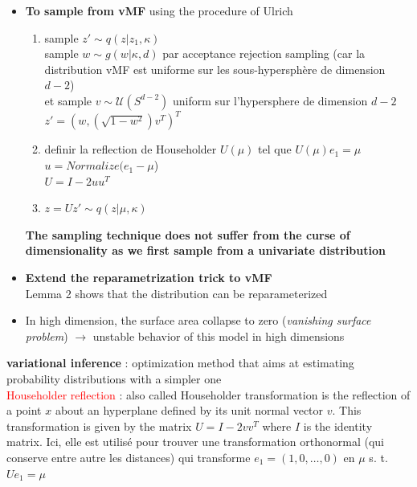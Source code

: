 \documentclass[12pt]{article}
\newcommand{\red}[1]{\textcolor{red}{#1}}
\begin{document}
\begin{itemize}
    \item \textbf{To sample from vMF} using the procedure of Ulrich \\
        \begin{enumerate}
            \item sample $z' \sim q(z| z_1, \kappa)$ \\
                 sample $w \sim g(w | \kappa, d)$ par acceptance rejection sampling (car la distribution vMF est uniforme sur les sous-hypersphère de dimension $d-2$)\\
                 et sample $v \sim \mathcal{U}(S^{d-2})$ uniform sur l'hypersphere de dimension $d-2$ \\
                 $z' = (w, (\sqrt{1 - w^2})v^T)^T$
            \item definir la reflection de Householder $U(\mu)$ tel que $U(\mu)e_1 = \mu$ \\
                $u = Normalize(e_1 - \mu$) \\
                $U = I - 2uu^T$
            \item $z = Uz' \sim q(z | \mu, \kappa)$

        \end{enumerate}

        \textbf{The sampling technique does not suffer from the curse of dimensionality as we first sample from a univariate distribution}
        
    \item \textbf{Extend the reparametrization trick to vMF}\\ 
    Lemma 2 shows that the distribution can be reparameterized
    \item In high dimension, the surface area collapse to zero (\textit{vanishing surface problem}) $\rightarrow$ unstable behavior of this model in high dimensions
\end{itemize}

\textbf{variational inference} : optimization method that aims at estimating probability distributions with a simpler one \\

\red{Householder reflection} : also called Householder transformation is the reflection of a point $x$ about an hyperplane defined by its unit normal vector $v$. This transformation is given by the matrix $U = I - 2vv^T$ where $I$ is the identity matrix. Ici, elle est utilisé pour trouver une transformation orthonormal (qui conserve entre autre les distances) qui transforme $e_1=(1, 0, \dots, 0)$ en $\mu$ s. t. $Ue_1 = \mu$\\ 
\end{document}
